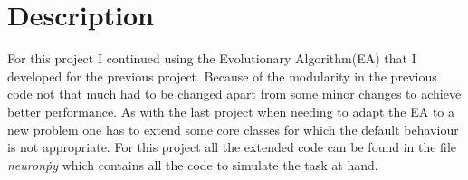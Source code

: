 \section{Description}\label{sec:description}
For this project I continued using the Evolutionary Algorithm(EA) that I
developed for the previous project. Because of the modularity in the previous
code not that much had to be changed apart from some minor changes to achieve
better performance. As with the last project when needing to adapt the EA to a
new problem one has to extend some core classes for which the default behaviour
is not appropriate. For this project all the extended code can be found in the
file \textit{neuron\.py} which contains all the code to simulate the task at
hand.
